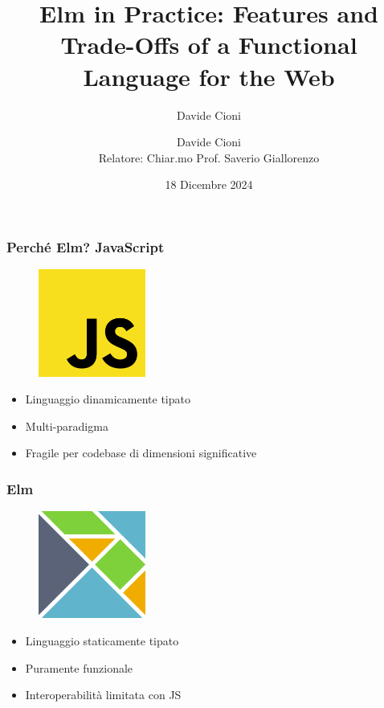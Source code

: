 \documentclass{beamer}
\title{Elm in Practice: Features and Trade-Offs of a Functional Language for the Web}
\author{Davide Cioni}
\author[Davide Cioni]{
    Davide Cioni
    \\{\small Relatore: Chiar.mo Prof. Saverio Giallorenzo}
    }
\institute{Alma Mater Studiorum $\cdot$ Università di Bologna}
\date{18 Dicembre 2024}
\begin{document}
\begin{frame}
  \titlepage
\end{frame}

\begin{frame}
    \frametitle{Perché Elm? JavaScript}
    \begin{figure}
      \centering
      \includegraphics[height=100pt]{assets/js-logo.png}
    \end{figure}
    \begin{itemize}
        \item Linguaggio dinamicamente tipato
        \item Multi-paradigma
        \item Fragile per codebase di dimensioni significative
    \end{itemize}
\end{frame}

\begin{frame}
  \frametitle{Elm}
  \begin{figure}
    \centering
    \includegraphics[height=100pt]{assets/elm-logo.png}
  \end{figure}
  \begin{itemize}
      \item Linguaggio staticamente tipato
      \item Puramente funzionale
      \item Interoperabilità limitata con JS
  \end{itemize}
\end{frame}
\end{document}

